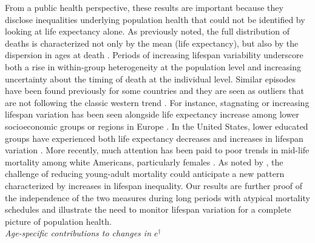 \documentclass{article}
\begin{document}
\begin{spacing}{1.5}
From a public health perspective, these results are important because they disclose inequalities underlying population health that could not be identified by looking at life expectancy alone. As previously noted, the full distribution of deaths is characterized not only by the mean (life expectancy), but also by the dispersion in ages at death \citep{edwards2005}. Periods of increasing lifespan variability underscore both a rise in within-group heterogeneity at the population level and increasing uncertainty about the timing of death at the individual level. Similar episodes have been found previously for some countries and they are seen as outliers that are not following the classic western trend \citep{wilmoth1999}. For instance, stagnating or increasing lifespan variation has been seen alongside life expectancy increase among lower socioeconomic groups or regions in Europe \citep{vanraalte2014,bronnum-hansen2017,seaman2016increasing}. In the United States, lower educated groups have experienced both life expectancy decreases and increases in lifespan variation \citep{sasson2016trends}. More recently, much attention has been paid to poor trends in mid-life mortality among white Americans, particularly females \citep{case2015rising,montez2013trends}. As noted by \citet{gillespie2014divergence}, the challenge of reducing young-adult mortality could anticipate a new pattern characterized by increases in lifespan inequality. Our results are further proof of the independence of the two measures during long periods with atypical mortality schedules and illustrate the need to monitor lifespan variation for a complete picture of population health.\\

\emph{Age-specific contributions to changes in $e^\dagger$}\\


\end{spacing}
\end{document}
